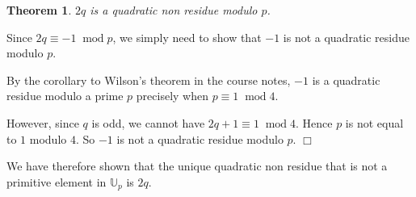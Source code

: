 \documentclass[10pt]{article}
\newtheorem{theorem}{Theorem}
\newenvironment{proof}[1][Proof]{\begin{trivlist}
\item[\hskip \labelsep {\bfseries #1}]}{\end{trivlist}}
\newcommand{\modulo}[1]{\;\operatorname{mod} #1}
\begin{document}
    \begin{theorem}
        $2q$ is a quadratic non residue modulo $p$.
    \end{theorem}
    \begin{proof}
        Since $2q\equiv -1\modulo{p}$, we simply
        need to show that $-1$ is not a quadratic residue
        modulo $p$. 
        
        By the corollary to Wilson's theorem in the course notes, 
        $-1$ is a quadratic residue modulo a prime $p$ precisely when $p\equiv 1\modulo{4}$.
        
        However, since $q$ is odd, we cannot have $2q+1\equiv 1\modulo{4}$. Hence
        $p$ is not equal to $1$ modulo $4$. So $-1$ is not a quadratic residue
        modulo $p$. $\Box$
    \end{proof}
    
    We have therefore shown that the unique quadratic non residue that
    is not a primitive element in $\mathbb{U}_p$
    is $2q$.
    
\end{document}
